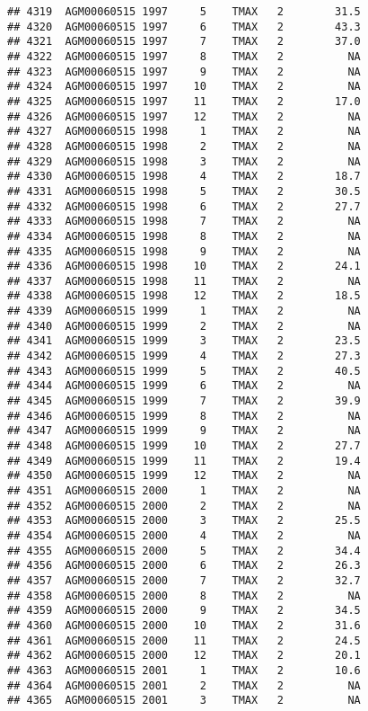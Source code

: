 \documentclass{article}\usepackage[]{graphicx}\usepackage[]{color}
\makeatletter
\newenvironment{kframe}{%
 \def\at@end@of@kframe{}%
 \ifinner\ifhmode%
  \def\at@end@of@kframe{\end{minipage}}%
  \begin{minipage}{\columnwidth}%
 \fi\fi%
 \def\FrameCommand##1{\hskip\@totalleftmargin \hskip-\fboxsep
 \colorbox{shadecolor}{##1}\hskip-\fboxsep
     \hskip-\linewidth \hskip-\@totalleftmargin \hskip\columnwidth}%
 \MakeFramed {\advance\hsize-\width
   \@totalleftmargin\z@ \linewidth\hsize
   \@setminipage}}%
 {\par\unskip\endMakeFramed%
 \at@end@of@kframe}
\newenvironment{knitrout}{}{} %
\makeatother
\begin{document}
\begin{knitrout}
\begin{kframe}
\begin{verbatim}
## 4319  AGM00060515 1997     5    TMAX   2        31.5
## 4320  AGM00060515 1997     6    TMAX   2        43.3
## 4321  AGM00060515 1997     7    TMAX   2        37.0
## 4322  AGM00060515 1997     8    TMAX   2          NA
## 4323  AGM00060515 1997     9    TMAX   2          NA
## 4324  AGM00060515 1997    10    TMAX   2          NA
## 4325  AGM00060515 1997    11    TMAX   2        17.0
## 4326  AGM00060515 1997    12    TMAX   2          NA
## 4327  AGM00060515 1998     1    TMAX   2          NA
## 4328  AGM00060515 1998     2    TMAX   2          NA
## 4329  AGM00060515 1998     3    TMAX   2          NA
## 4330  AGM00060515 1998     4    TMAX   2        18.7
## 4331  AGM00060515 1998     5    TMAX   2        30.5
## 4332  AGM00060515 1998     6    TMAX   2        27.7
## 4333  AGM00060515 1998     7    TMAX   2          NA
## 4334  AGM00060515 1998     8    TMAX   2          NA
## 4335  AGM00060515 1998     9    TMAX   2          NA
## 4336  AGM00060515 1998    10    TMAX   2        24.1
## 4337  AGM00060515 1998    11    TMAX   2          NA
## 4338  AGM00060515 1998    12    TMAX   2        18.5
## 4339  AGM00060515 1999     1    TMAX   2          NA
## 4340  AGM00060515 1999     2    TMAX   2          NA
## 4341  AGM00060515 1999     3    TMAX   2        23.5
## 4342  AGM00060515 1999     4    TMAX   2        27.3
## 4343  AGM00060515 1999     5    TMAX   2        40.5
## 4344  AGM00060515 1999     6    TMAX   2          NA
## 4345  AGM00060515 1999     7    TMAX   2        39.9
## 4346  AGM00060515 1999     8    TMAX   2          NA
## 4347  AGM00060515 1999     9    TMAX   2          NA
## 4348  AGM00060515 1999    10    TMAX   2        27.7
## 4349  AGM00060515 1999    11    TMAX   2        19.4
## 4350  AGM00060515 1999    12    TMAX   2          NA
## 4351  AGM00060515 2000     1    TMAX   2          NA
## 4352  AGM00060515 2000     2    TMAX   2          NA
## 4353  AGM00060515 2000     3    TMAX   2        25.5
## 4354  AGM00060515 2000     4    TMAX   2          NA
## 4355  AGM00060515 2000     5    TMAX   2        34.4
## 4356  AGM00060515 2000     6    TMAX   2        26.3
## 4357  AGM00060515 2000     7    TMAX   2        32.7
## 4358  AGM00060515 2000     8    TMAX   2          NA
## 4359  AGM00060515 2000     9    TMAX   2        34.5
## 4360  AGM00060515 2000    10    TMAX   2        31.6
## 4361  AGM00060515 2000    11    TMAX   2        24.5
## 4362  AGM00060515 2000    12    TMAX   2        20.1
## 4363  AGM00060515 2001     1    TMAX   2        10.6
## 4364  AGM00060515 2001     2    TMAX   2          NA
## 4365  AGM00060515 2001     3    TMAX   2          NA

\end{verbatim}
\end{kframe}
\end{knitrout}
\end{document}
